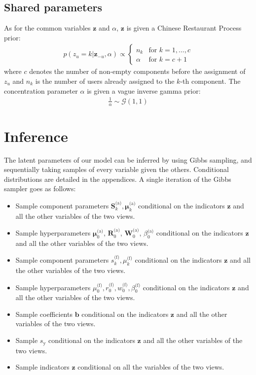 \documentclass[smallextended]{svjour3}          %
\newcommand{\Muo}{\boldsymbol{\mu}_{0}^\text{(a)}}
\newcommand{\Ro}{\mathbf{R}_{0}^\text{(a)}}
\newcommand{\Wo}{\mathbf{W}_{0}^\text{(a)}}
\newcommand{\betaoa}{\beta_{0}^\text{(a)}}
\newcommand{\muo}{\mu_{0}^\text{(f)}}
\newcommand{\ro}{r_{0}^\text{(f)}}
\newcommand{\wo}{w_{0}^\text{(f)}}
\newcommand{\betaof}{\beta_{0}^\text{(f)}}
\newcommand{\Muk}{\boldsymbol{\mu}_{k}^\text{(a)}}
\newcommand{\Sk}{\mathbf{S}_{k}^\text{(a)}}
\newcommand{\muk}{\mu_{k}^\text{(f)}}
\newcommand{\sk}{s_{k}^\text{(f)}}
\begin{document}
\subsection{Shared parameters}\label{sec:sharedparams}
As for the common variables $\mathbf{z}$ and $\alpha$, $\mathbf{z}$ is given a Chinese Restaurant Process prior:
\begin{align}
\label{eq:prior_z_CRP}
p(z_u = k | \mathbf{z}_{-u}, \alpha) \propto 
\begin{cases}
n_{k} & \text{for } k=1,...,c\\
\alpha & \text{for } k=c+1
\end{cases}
\end{align}
where $c$ denotes the number of non-empty components before the assignment of $z_u$ and $n_k$ is the number of users already assigned to the $k$-th component. The concentration parameter $\alpha$ is given a vague inverse gamma prior:
\begin{align*}
\frac{1}{\alpha} \sim \mathcal{G}(1,1)
\end{align*}


\section{Inference}\label{sec:inference}
The latent parameters of our model can be inferred by using Gibbs sampling, and sequentially taking samples of every variable given the others. Conditional distributions are detailed in the appendices. A single iteration of the Gibbs sampler goes as follows: 

\begin{itemize}
\item Sample component parameters $\Sk, \Muk$ conditional on the indicators $\mathbf{z}$ and all the other variables of the two views.
\item Sample hyperparameters $\Muo$, $\Ro$, $\Wo$, $\betaoa$ conditional on  the indicators $\mathbf{z}$ and all the other variables of the two views.
\item Sample component parameters $\sk, \muk$ conditional on the indicators $\mathbf{z}$ and all the other variables of the two views.
\item Sample hyperparameters $\muo, \ro, \wo, \betaof$ conditional on the indicators $\mathbf{z}$ and all the other variables of the two views.
\item Sample coefficients $\mathbf{b}$ conditional on the indicators $\mathbf{z}$ and all the other variables of the two views.
\item Sample $s_{\text{y}}$ conditional on the indicators $\mathbf{z}$ and all the other variables of the two views.
\item Sample indicators $\mathbf{z}$ conditional on all the variables of the two views.
\end{itemize} 
\end{document}
